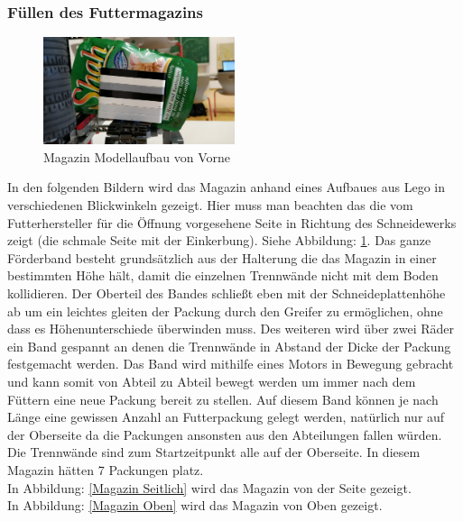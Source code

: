 \subsubsection{Füllen des Futtermagazins}


\begin{figure}
\vspace{-30pt}
  \begin{center}
    \includegraphics[width=0.50\textwidth]{Bilder/Ablauf_1_png/Magazin_Vorne}
  \end{center}
  \caption{Magazin Modellaufbau von Vorne}
  \label{Magazin Vorne}
  \vspace{-10pt}
\end{figure}

In den folgenden Bildern wird das Magazin anhand eines Aufbaues aus Lego in verschiedenen Blickwinkeln gezeigt. Hier muss man beachten das die vom Futterhersteller für die Öffnung vorgesehene Seite in Richtung des Schneidewerks zeigt (die schmale Seite mit der Einkerbung). Siehe Abbildung: \ref{Magazin Vorne}.
Das ganze Förderband besteht grundsätzlich aus der Halterung die das Magazin in einer bestimmten Höhe hält, damit die einzelnen Trennwände nicht mit dem Boden kollidieren. Der Oberteil des Bandes schließt eben mit der Schneideplattenhöhe ab um ein leichtes gleiten der Packung durch den Greifer zu ermöglichen, ohne dass es Höhenunterschiede überwinden muss. Des weiteren wird über zwei Räder ein Band gespannt an denen die Trennwände in Abstand der Dicke der Packung festgemacht werden. Das Band wird mithilfe eines Motors in Bewegung gebracht und kann somit von Abteil zu Abteil bewegt werden um immer nach dem Füttern eine neue Packung bereit zu stellen. Auf diesem Band können je nach Länge eine gewissen Anzahl an Futterpackung gelegt werden, natürlich nur auf der Oberseite da die Packungen ansonsten aus den Abteilungen fallen würden. Die Trennwände sind zum Startzeitpunkt alle auf der Oberseite. In diesem Magazin hätten 7 Packungen platz.\\

In Abbildung: \ref{Magazin Seitlich} wird das Magazin von der Seite gezeigt. \\
In Abbildung: \ref{Magazin Oben} wird das Magazin von Oben gezeigt. 

